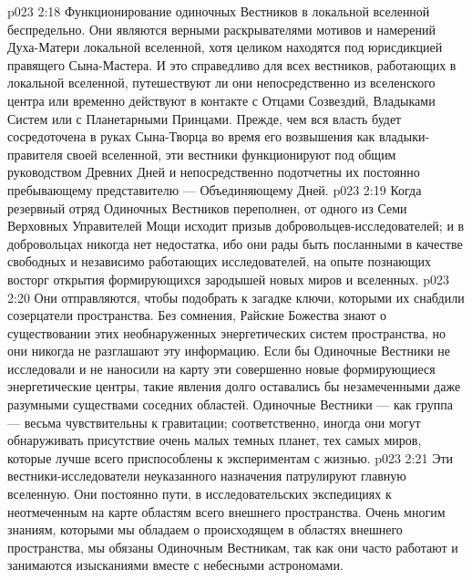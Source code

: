 \vs p023 2:18 \pc {}\bibnobreakspace {} Функционирование одиночных Вестников в локальной вселенной беспредельно. Они являются верными раскрывателями мотивов и намерений Духа\hyp{}Матери локальной вселенной, хотя целиком находятся под юрисдикцией правящего Сына\hyp{}Мастера. И это справедливо для всех вестников, работающих в локальной вселенной, путешествуют ли они непосредственно из вселенского центра или временно действуют в контакте с Отцами Созвездий, Владыками Систем или с Планетарными Принцами. Прежде, чем вся власть будет сосредоточена в руках Сына\hyp{}Творца во время его возвышения как владыки\hyp{}правителя своей вселенной, эти вестники функционируют под общим руководством Древних Дней и непосредственно подотчетны их постоянно пребывающему представителю --- Объединяющему Дней.
\vs p023 2:19 \pc {}\bibnobreakspace {} Когда резервный отряд Одиночных Вестников переполнен, от одного из Семи Верховных Управителей Мощи исходит призыв добровольцев\hyp{}исследователей; и в добровольцах никогда нет недостатка, ибо они рады быть посланными в качестве свободных и независимо работающих исследователей, на опыте познающих восторг открытия формирующихся зародышей новых миров и вселенных.
\vs p023 2:20 Они отправляются, чтобы подобрать к загадке ключи, которыми их снабдили созерцатели пространства. Без сомнения, Райские Божества знают о существовании этих необнаруженных энергетических систем пространства, но они никогда не разглашают эту информацию. Если бы Одиночные Вестники не исследовали и не наносили на карту эти совершенно новые формирующиеся энергетические центры, такие явления долго оставались бы незамеченными даже разумными существами соседних областей. Одиночные Вестники --- как группа --- весьма чувствительны к гравитации; соответственно, иногда они могут обнаруживать присутствие очень малых темных планет, тех самых миров, которые лучше всего приспособлены к экспериментам с жизнью.
\vs p023 2:21 Эти вестники\hyp{}исследователи неуказанного назначения патрулируют главную вселенную. Они постоянно пути, в исследовательских экспедициях к неотмеченным на карте областям всего внешнего пространства. Очень многим знаниям, которыми мы обладаем о происходящем в областях внешнего пространства, мы обязаны Одиночным Вестникам, так как они часто работают и занимаются изысканиями вместе с небесными астрономами.
